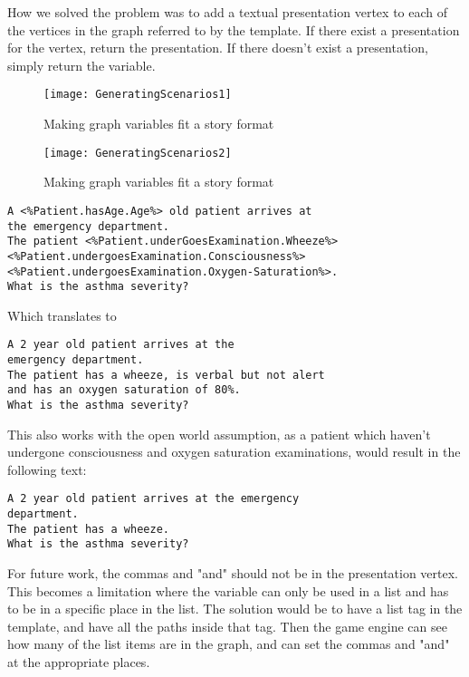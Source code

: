 How we solved the problem was to add a textual presentation vertex to each of the vertices in the graph referred to by the template. If there exist a presentation for the vertex, return the presentation. If there doesn't exist a presentation, simply return the variable.

\begin{figure}[h!]
	\texttt{[image: GeneratingScenarios1]}
	\caption {Making graph variables fit a story format}
	\label{fig:GeneratingScenarios1}
\end{figure}

\begin{figure}[h!]
	\texttt{[image: GeneratingScenarios2]}
		\caption {Making graph variables fit a story format}
		\label{fig:GeneratingScenarios2}
\end{figure}

\begin{lstlisting}[caption={Question template}, frame=single, captionpos=b] 
A <%Patient.hasAge.Age%> old patient arrives at 
the emergency department. 
The patient <%Patient.underGoesExamination.Wheeze%> 
<%Patient.undergoesExamination.Consciousness%> 
<%Patient.undergoesExamination.Oxygen-Saturation%>. 
What is the asthma severity? 
\end{lstlisting}

Which translates to 
\begin{lstlisting}[caption={Question instantiation}, frame=single, captionpos=b] 
A 2 year old patient arrives at the 
emergency department. 
The patient has a wheeze, is verbal but not alert 
and has an oxygen saturation of 80%. 
What is the asthma severity? 
\end{lstlisting}

This also works with the open world assumption, as a patient which haven't undergone consciousness and oxygen saturation examinations, would result in the following text:

\begin{lstlisting}[caption={Question instantiation}, frame=single, captionpos=b] 
A 2 year old patient arrives at the emergency 
department. 
The patient has a wheeze. 
What is the asthma severity? 
\end{lstlisting}

For future work, the commas and "and" should not be in the presentation vertex. This becomes a limitation where the variable can only be used in a list and has to be in a specific place in the list. The solution would be to have a list tag in the template, and have all the paths inside that tag. Then the game engine can see how many of the list items are in the graph, and can set the commas and "and" at the appropriate places.

